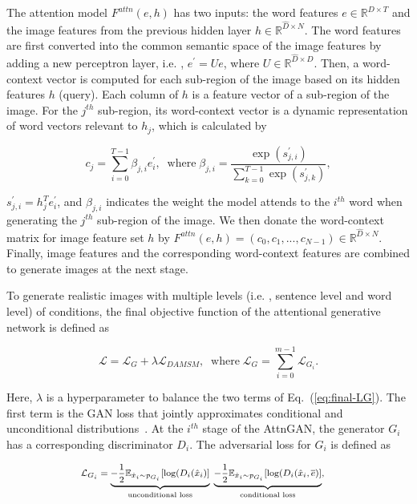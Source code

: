 The attention model $F^{attn}(e, h)$ has two inputs: the word features $e \in \mathbb{R}^{D\times T}$ and the image features from the previous hidden layer $h \in \mathbb{R}^{\hat{D}\times N}$. The word features are first converted into the common semantic space of the image features by adding a new perceptron layer, i.e. , $e^{\prime} = Ue$, where $U \in \mathbb{R}^{\hat{D}\times D}$. Then, a word-context vector is computed for each sub-region of the image based on its hidden features $h$ (query). Each column of $h$ is a feature vector of a sub-region of the image. For the $j^{th}$ sub-region, its word-context vector is a dynamic representation of word vectors relevant to $h_j$, which is calculated by

\begin{equation}\label{eq:AttnGAN}
  c_j = \sum_{i=0}^{T-1}\beta_{j,i}e^{\prime}_{i}, \; \; \text{where} \; \beta_{j,i} = \frac{\exp(s_{j,i}^{\prime})}{\sum_{k=0}^{T-1}{\exp(s_{j,k}^{\prime})}}, 
 \end{equation}

$s_{j,i}^{\prime}= h_j^T e^{\prime}_i$, and $\beta_{j,i}$ indicates the weight the model attends to the $i^{th}$ word when generating the $j^{th}$  sub-region of the image.  We then donate the word-context matrix for image feature set $h$ by $F^{attn}(e, h) = (c_0, c_1,..., c_{N-1}) \in \mathbb{R}^{\hat{D}\times N}$. Finally, image features and the corresponding word-context features are combined to generate images at the next stage. 

To generate realistic images with multiple levels (i.e. , sentence level and word level) of conditions, the final objective function of the attentional generative network is defined as

\begin{equation}\label{eq:final-LG}
  \mathcal{L} = \mathcal{L}_{G} + \lambda\mathcal{L}_{DAMSM}, \; \; \text{where} \; \mathcal{L}_{G} = \sum_{i=0}^{m-1} \mathcal{L}_{G_{i}}.
 \end{equation}

Here, $\lambda$ is a hyperparameter to balance the two terms of Eq.~(\ref{eq:final-LG}). The first term is the GAN loss that jointly approximates conditional and unconditional distributions~\cite{Han17stackgan2}. At the $i^{th}$ stage of the AttnGAN, the generator $G_i$ has a corresponding discriminator $D_i$. The adversarial loss for $G_i$ is defined as

\begin{equation}\label{eq:hybrid-LGi}
  \footnotesize
   \begin{aligned}
    \mathcal{L}_{G_{i}} &= \underbrace{-\frac{1}{2} \mathbb{E}_{\hat{x}_{i} \sim {p_{G_{i}}}} [\log(D_{i}(\hat{x}_{i})] }_\text{unconditional loss} \; \underbrace{-\frac{1}{2} \mathbb{E}_{\hat{x}_{i} \sim {p_{G_{i}}}} [\log(D_{i}(\hat{x}_{i}, \overline{e})]}_\text{conditional loss},
   \end{aligned}
 \end{equation}

